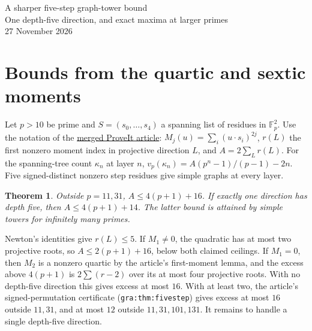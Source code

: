 \documentclass[11pt]{article}
\newtheorem{theorem}{Theorem}
\newcommand{\F}{\mathbb F}
\begin{document}
\begin{center}
{\LARGE A sharper five-step graph-tower bound}\\[5pt]
{\large One depth-five direction, and exact maxima at larger primes}\\[6pt]
{\small 27 November 2026}
\end{center}
\begin{abstract}
We lower the general five-step ceiling from $4(p+1)+18$ to
$4(p+1)+16$ outside $p=11,31$. Precisely one depth-five direction
gives excess at most $14$, attained for infinitely many primes.
A finite incidence search makes this a statement about the
unrestricted optimum at $1031,1511,1571,2351$, and also separates
simple and unrestricted optima at $761$ and $2281$.
A separate table supplies fifteen exact benchmarks through $181$.
\end{abstract}
\section{Bounds from the quartic and sextic moments}
Let $p>10$ be prime and $S=(s_0,\ldots,s_4)$ a spanning list of
residues in $\F_p^2$. Use the notation of the
\href{https://github.com/VladimirReshetnikov/ProveIt/blob/f6b5955e13bcefb2760480e7b823eba55ed2383e/Analysis/GeneralizedRiemannHypothesis/Article/sections/gra.tex}{merged ProveIt article}:
$M_j(u)=\sum_i(u\cdot s_i)^{2j}$, $r(L)$ the first nonzero
moment index in projective direction $L$, and $A=2\sum_Lr(L)$.
For the spanning-tree count $\kappa_n$ at layer $n$,
$v_p(\kappa_n)=A(p^n-1)/(p-1)-2n$.
Five signed-distinct nonzero step residues give simple graphs at every layer.

\begin{theorem}
Outside $p=11,31$, $A\le4(p+1)+16$. If exactly one direction has
depth five, then $A\le4(p+1)+14$. The latter bound is attained
by simple towers for infinitely many primes.
\end{theorem}

Newton's identities give $r(L)\le5$. If $M_1\ne0$, the quadratic
has at most two projective roots, so $A\le2(p+1)+16$, below both
claimed ceilings. If $M_1=0$, then $M_2$ is a nonzero quartic
by the article's first-moment lemma, and the excess above $4(p+1)$
is $2\sum(r-2)$ over its at most four projective roots.
With no depth-five direction this gives excess at most $16$.
With at least two, the article's signed-permutation certificate
(\texttt{gra:thm:fivestep}) gives excess at most $16$ outside
$11,31$, and at most $12$ outside $11,31,101,131$.
It remains to handle a single depth-five direction.
\end{document}
